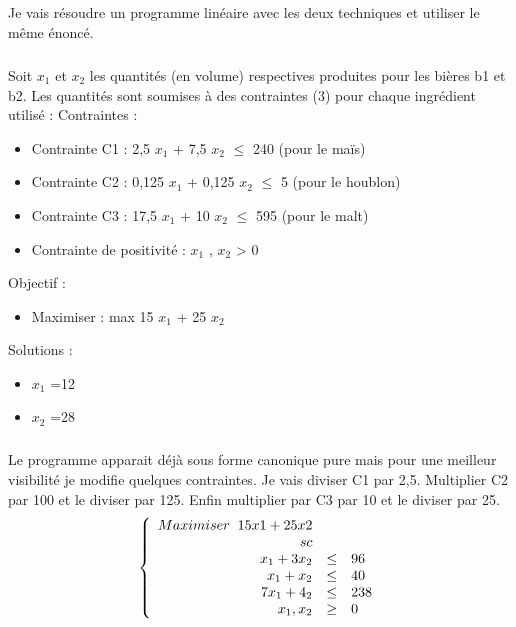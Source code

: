 \documentclass[a4paper, 12pt, twoside]{article}
\begin{document}
\subparagraph*{}{Je vais résoudre un programme linéaire avec les deux techniques et utiliser  le même énoncé.}

\subparagraph*{}{Soit $x_{1}$ et $x_{2}$ les quantités (en volume) respectives produites pour les bières b1 et b2. Les quantités sont soumises à des contraintes (3) pour chaque ingrédient utilisé :} \newline \textsf{Contraintes : }
\begin{itemize} 
\item   Contrainte C1 : 2,5 $x_{1}$ + 7,5 $x_{2}$  $\leq$ 240 (pour le maïs)
\item   Contrainte C2 : 0,125 $x_{1}$ + 0,125 $x_{2}$ $\leq$ 5 (pour le houblon)
\item   Contrainte C3 : 17,5 $x_{1}$ + 10 $x_{2}$  $\leq$ 595 (pour le malt)
\item  Contrainte  de positivité : $x_{1}$ , $x_{2}$ > 0
\end{itemize}
\textsf{Objectif : }
\begin{itemize} 
\item Maximiser : max 15 $x_{1}$ + 25 $x_{2}$
\end{itemize}
\textsf{Solutions : }
\begin{itemize} 
\item $x_{1}$ =12
\item $x_{2}$ =28
\end{itemize}
\subparagraph*{}{Le programme apparait déjà sous forme canonique pure mais pour une meilleur visibilité je modifie quelques contraintes. Je vais diviser C1 par 2,5. Multiplier C2 par 100 et  le diviser par 125. Enfin multiplier par C3 par 10 et le diviser par 25.}
\[
\left \{
   \begin{array}{r c l}
   Maximiser \hspace{0,2cm} 15 x1 + 25 x2 \\
   sc \\
      x_{1} + 3x_{2} & \leq & 96 \\
      x_{1} +x_{2}  & \leq &40  \\
      7x_{1} + 4_{2} & \leq & 238 \\
      x_{1},x_{2} &\geq & 0
   \end{array}
   \right.
\]
\end{document}
